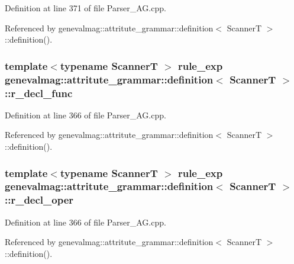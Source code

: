 Definition at line 371 of file Parser\_\-AG.cpp.



Referenced by genevalmag::attritute\_\-grammar::definition$<$ ScannerT $>$::definition().

\hypertarget{structgenevalmag_1_1attritute__grammar_1_1definition_a411b4044b46f24a80cdbed21c688c7b7}{
\subsubsection[{r\_\-decl\_\-func}]{\setlength{\rightskip}{0pt plus 5cm}template$<$typename ScannerT $>$ {\bf rule\_\-exp} {\bf genevalmag::attritute\_\-grammar::definition}$<$ ScannerT $>$::{\bf r\_\-decl\_\-func}}}
\label{structgenevalmag_1_1attritute__grammar_1_1definition_a411b4044b46f24a80cdbed21c688c7b7}


Definition at line 366 of file Parser\_\-AG.cpp.



Referenced by genevalmag::attritute\_\-grammar::definition$<$ ScannerT $>$::definition().

\hypertarget{structgenevalmag_1_1attritute__grammar_1_1definition_a20ea69e0be24e838bb6c8592abeee442}{
\subsubsection[{r\_\-decl\_\-oper}]{\setlength{\rightskip}{0pt plus 5cm}template$<$typename ScannerT $>$ {\bf rule\_\-exp} {\bf genevalmag::attritute\_\-grammar::definition}$<$ ScannerT $>$::{\bf r\_\-decl\_\-oper}}}
\label{structgenevalmag_1_1attritute__grammar_1_1definition_a20ea69e0be24e838bb6c8592abeee442}


Definition at line 366 of file Parser\_\-AG.cpp.



Referenced by genevalmag::attritute\_\-grammar::definition$<$ ScannerT $>$::definition().

